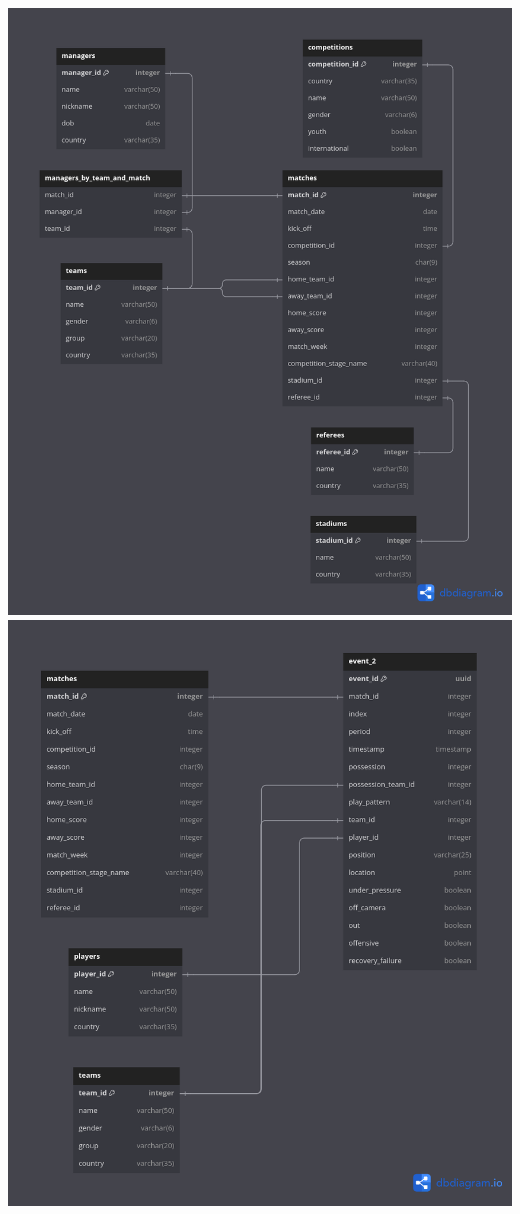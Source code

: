 \documentclass[12pt]{article}
\begin{document}
\includegraphics[width=\textwidth]{schema-diagram/matches_schema.png}
\includegraphics[width=\textwidth]{schema-diagram/event_2.png}
\end{document}
